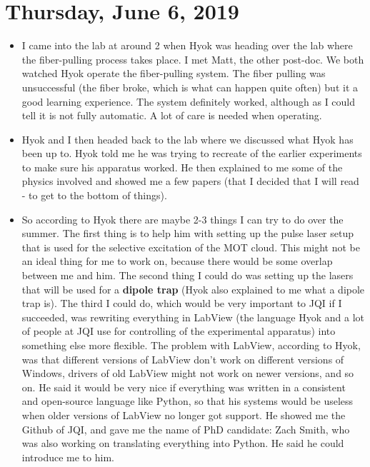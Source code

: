 \documentclass{report}
\theoremstyle{definition}
\begin{document}
\section{Thursday, June 6, 2019}
	\begin{itemize}
	\item I came into the lab at around 2 when Hyok was heading over the lab where the fiber-pulling process takes place. I met Matt, the other post-doc. We both watched Hyok operate the fiber-pulling system. The fiber pulling was unsuccessful (the fiber broke, which is what can happen quite often) but it a good learning experience. The system definitely worked, although as I could tell it is not fully automatic. A lot of care is needed when operating.
	
	
	\item Hyok and I then headed back to the lab where we discussed what Hyok has been up to. Hyok told me he was trying to recreate of the earlier experiments to make sure his apparatus worked. He then explained to me some of the physics involved and showed me a few papers (that I decided that I will read - to get to the bottom of things). 
	
	
	\item So according to Hyok there are maybe 2-3 things I can try to do over the summer. The first thing is to help him with setting up the pulse laser setup that is used for the selective excitation of the MOT cloud. This might not be an ideal thing for me to work on, because there would be some overlap between me and him. The second thing I could do was setting up the lasers that will be used for a \textbf{dipole trap} (Hyok also explained to me what a dipole trap is). The third I could do, which would be very important to JQI if I succeeded, was rewriting everything in LabView (the language Hyok and a lot of people at JQI use for controlling of the experimental apparatus) into something else more flexible. The problem with LabView, according to Hyok, was that different versions of LabView don't work on different versions of Windows, drivers of old LabView might not work on newer versions, and so on. He said it would be very nice if everything was written in a consistent and open-source language like Python, so that his systems would be useless when older versions of LabView no longer got support. He showed me the Github of JQI, and gave me the name of PhD candidate: Zach Smith, who was also working on translating everything into Python. He said he could introduce me to him.
	

\end{itemize}
\end{document}
